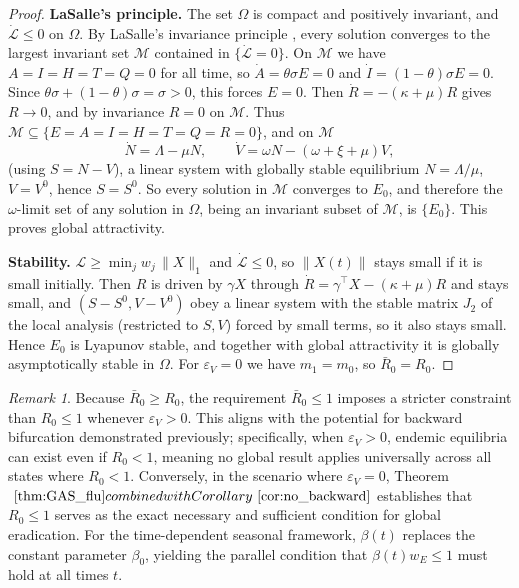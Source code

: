\documentclass[12pt,a4paper]{article}
\theoremstyle{definition}
\theoremstyle{remark}
\newtheorem{remark}[theorem]{Remark}
\begin{document}
\begin{proof}
\textbf{LaSalle's principle.} The set $\Omega$ is compact and positively invariant, and
$\dot{\mathcal L}\le0$ on $\Omega$. By LaSalle's invariance principle
\cite{LaSalle1976}, every solution converges to the largest invariant set
$\mathcal M$ contained in $\{\dot{\mathcal L}=0\}$. On $\mathcal M$ we have
$A=I=H=T=Q=0$ for all time, so $\dot A=\theta\sigma E=0$ and $\dot I=(1-\theta)\sigma E=0$.
Since $\theta\sigma+(1-\theta)\sigma=\sigma>0$, this forces $E=0$. Then
$\dot R=-(\kappa+\mu)R$ gives $R\to0$, and by invariance $R=0$ on $\mathcal M$.
Thus $\mathcal M\subseteq\{E=A=I=H=T=Q=R=0\}$, and on $\mathcal M$
\[
\dot N=\Lambda-\mu N,\qquad \dot V=\omega N-(\omega+\xi+\mu)V,
\]
(using $S=N-V$), a linear system with globally stable equilibrium
$N=\Lambda/\mu$, $V=V^0$, hence $S=S^0$. So every solution in $\mathcal M$ converges to
$E_0$, and therefore the $\omega$-limit set of any solution in $\Omega$, being an
invariant subset of $\mathcal M$, is $\{E_0\}$. This proves global attractivity.

\textbf{Stability.} $\mathcal L\ge \min_j w_j\,\|X\|_1$ and $\dot{\mathcal L}\le0$, so
$\|X(t)\|$ stays small if it is small initially. Then $R$ is driven by
$\gamma X$ through $\dot R=\gamma^\top X-(\kappa+\mu)R$ and stays small, and
$(S-S^0,V-V^0)$ obey a linear system with the stable matrix $J_2$ of the local
analysis (restricted to $S,V$) forced by small terms, so it also stays small.
Hence $E_0$ is Lyapunov stable, and together with global attractivity it is
globally asymptotically stable in $\Omega$. For $\varepsilon_V=0$ we have
$m_1=m_0$, so $\bar R_0=R_0$.
\end{proof}

\begin{remark}
Because $\bar R_0\ge R_0$, the requirement $\bar R_0\le1$ imposes a stricter constraint than $R_0\le1$ whenever $\varepsilon_V>0$. This aligns with the potential for backward bifurcation demonstrated previously; specifically, when $\varepsilon_V>0$, endemic equilibria can exist even if $R_0<1$, meaning no global result applies universally across all states where $R_0<1$. Conversely, in the scenario where $\varepsilon_V=0$, Theorem$~\ref{thm:GAS_flu} combined with Corollary~\ref{cor:no_backward}$ establishes that $R_0\le1$ serves as the exact necessary and sufficient condition for global eradication. For the time-dependent seasonal framework, $\beta(t)$ replaces the constant parameter $\beta_0$, yielding the parallel condition that $\beta(t)w_E\le1$ must hold at all times $t$.
\end{remark}
\end{document}
